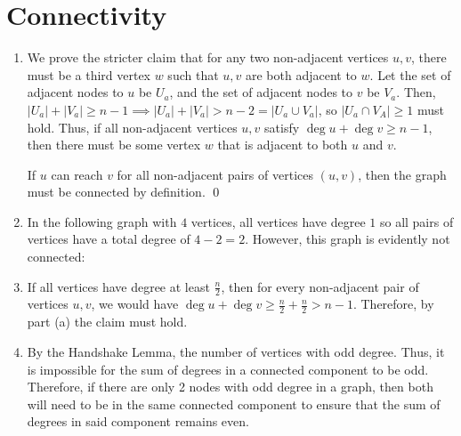 \documentclass{article}
\begin{document}
	\section{Connectivity}
	\begin{enumerate}[label=\alph*.]
		\item We prove the stricter claim that for any two non-adjacent vertices $u, v$, there must 
		be a third vertex $w$ such that $u,v$ are both adjacent to $w$. Let the set of adjacent nodes 
		to $u$ be $U_a$, and the set of adjacent nodes to $v$ be $V_a$. Then, $|U_a| + |V_a| \geq n-1
		\implies |U_a| + |V_a| > n-2 = |U_a \cup V_a|$, so $|U_a \cap V_A| \geq 1$ must hold. Thus,
		if all non-adjacent vertices $u, v$ satisfy $\deg u + \deg v \geq n-1$, then there must be 
		some vertex $w$ that is adjacent to both $u$ and $v$. 

		If $u$ can reach $v$ for all non-adjacent pairs of vertices $(u, v)$, then the graph must 
		be connected by definition. \qed
		\item In the following graph with $4$ vertices, all vertices have degree $1$ so all 
		pairs of vertices have a total degree of $4-2 = 2$. However, this graph is evidently not connected:
		\begin{center}
		\end{center}
		\item If all vertices have degree at least $\frac{n}{2}$, then for every non-adjacent 
		pair of vertices $u, v$, we would have $\deg u + \deg v \geq \frac{n}{2} + \frac{n}{2} > n-1$.
		Therefore, by part (a) the claim must hold.
		\item By the Handshake Lemma, the number of vertices with odd degree.
		Thus, it is impossible for the sum of degrees in a connected component 
		to be odd. Therefore, if there are only 2 nodes with odd degree in a graph, then both will 
		need to be in the 
		same connected component to ensure that the sum of degrees in said component remains even.
	\end{enumerate}
\end{document}
